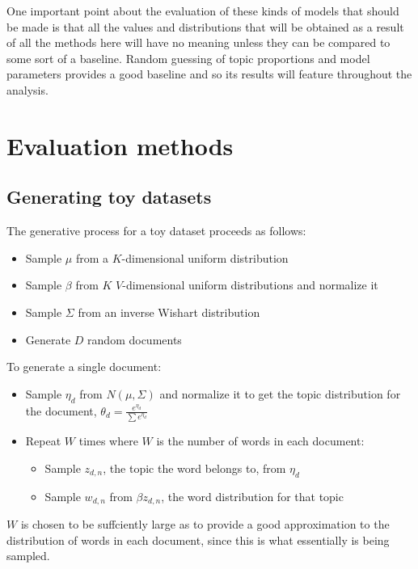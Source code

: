 \documentclass[12pt,a4paper,twoside,openright]{report}
\begin{document}
One important point about the evaluation of these kinds of models that should be made is that all the values and distributions that will be obtained as a result of all the methods here will have no meaning unless they can be compared to some sort of a baseline. Random guessing of topic proportions and model parameters provides a good baseline and so its results will feature throughout the analysis.

\section{Evaluation methods}

\subsection{Generating toy datasets}

The generative process for a toy dataset proceeds as follows:

\begin{itemize}[noitemsep]
\item Sample $\mu$ from a $K$-dimensional uniform distribution
\item Sample $\beta$ from $K$ $V$-dimensional uniform distributions and normalize it
\item Sample $\Sigma$ from an inverse Wishart distribution
\item Generate $D$ random documents
\end{itemize}

To generate a single document:

\begin{itemize}[noitemsep]
\item Sample $\eta_d$ from $N(\mu, \Sigma)$ and normalize it to get the topic distribution for the document, $\theta_d = \frac{e^{\eta_d}}{\sum{e^{\eta_d}}}$
\item Repeat $W$ times where $W$ is the number of words in each document:
\begin{itemize}[noitemsep]
\item Sample $z_{d, n}$, the topic the word belongs to, from $\eta_d$
\item Sample $w_{d, n}$ from $\beta{z_{d, n}}$, the word distribution for that topic
\end{itemize}
\end{itemize}

$W$ is chosen to be suffciently large as to provide a good approximation to the distribution of words in each document, since this is what essentially is being sampled.
\end{document}

